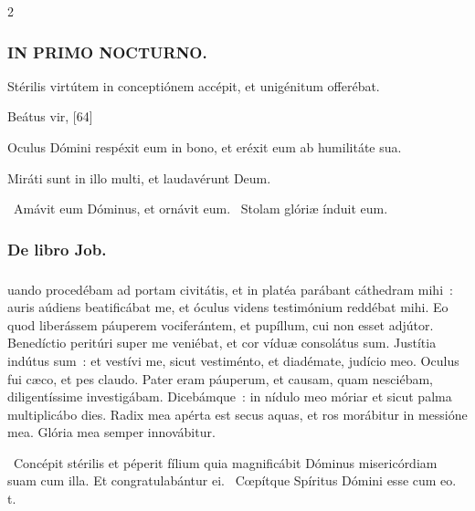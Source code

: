 \documentclass[9pt,twoside]{extarticle}
\begin{document}
\begin{multicols}{2}
{\subsubsection*{\center \textsc{IN PRIMO NOCTURNO.}}
\begin{tightlist}{}
\item {} Stérilis virtútem in conceptiónem accépit, et unigénitum offerébat.
\item {} Beátus vir,  [64]
\item {} Oculus Dómini respéxit eum in bono, et eréxit eum ab humilitáte sua.
\item {} Miráti sunt in illo multi, et laudavérunt Deum.
\item {}~Amávit eum Dóminus, et ornávit eum. ~Stolam glóriæ índuit eum.
\item {}
\end{tightlist}

\subsubsection*{\center De libro Job.}
\subsubsection*{\center {}}
uando procedébam ad portam civitátis, et in platéa parábant cáthedram mihi~: auris aúdiens beatificábat me, et óculus videns testimónium reddébat mihi. Eo quod liberássem páuperem vociferántem, et pupíllum, cui non esset adjútor. Benedíctio peritúri super me veniébat, et cor víduæ consolátus sum. Justítia indútus sum~: et vestívi me, sicut vestiménto, et diadémate, judício meo. Oculus fui cæco, et pes claudo. Pater eram páuperum, et causam, quam nesciébam, diligentíssime investigábam. Dicebámque~: in nídulo meo móriar et sicut palma multiplicábo dies. Radix mea apérta est secus aquas, et ros morábitur in messióne mea. Glória mea semper innovábitur.

\begin{tightlist}{}
\item {}~Concépit stérilis et péperit fílium quia magnificábit Dóminus misericórdiam suam cum illa. \textred{*} Et congratulabántur ei. ~Cœpítque Spíritus Dómini esse cum eo. t.
\end{tightlist}

}
\end{multicols}
\end{document}
